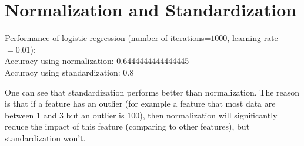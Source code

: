 \section{Normalization and Standardization}

\noindent
Performance of logistic regression (number of iterations=$1000$, learning rate$=0.01$):\\
Accuracy using normalization: 0.6444444444444445\\
Accuracy using standardization: 0.8

One can see that standardization performs better than normalization. The reason is that if a feature has an outlier (for example a feature that most data are between $1$ and $3$ but an outlier is $100$), then normalization will significantly reduce the impact of this feature (comparing to other features), but standardization won't.

